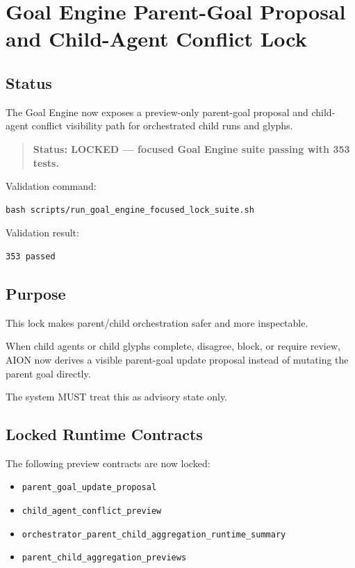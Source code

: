\section{Goal Engine Parent-Goal Proposal and Child-Agent Conflict Lock}
\label{sec:goal-engine-parent-goal-proposal-conflict-lock}

\subsection{Status}

The Goal Engine now exposes a preview-only parent-goal proposal and child-agent conflict visibility path for orchestrated child runs and glyphs.

\begin{quote}
\textbf{Status: LOCKED --- focused Goal Engine suite passing with 353 tests.}
\end{quote}

Validation command:

\begin{verbatim}
bash scripts/run_goal_engine_focused_lock_suite.sh
\end{verbatim}

Validation result:

\begin{verbatim}
353 passed
\end{verbatim}

\subsection{Purpose}

This lock makes parent/child orchestration safer and more inspectable.

When child agents or child glyphs complete, disagree, block, or require review, AION now derives a visible parent-goal update proposal instead of mutating the parent goal directly.

The system MUST treat this as advisory state only.

\subsection{Locked Runtime Contracts}

The following preview contracts are now locked:

\begin{itemize}
  \item \texttt{parent\_goal\_update\_proposal}
  \item \texttt{child\_agent\_conflict\_preview}
  \item \texttt{orchestrator\_parent\_child\_aggregation\_runtime\_summary}
  \item \texttt{parent\_child\_aggregation\_previews}
\end{itemize}


